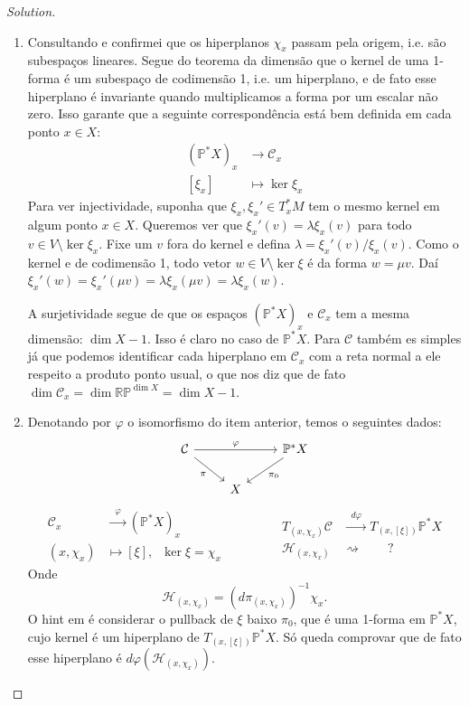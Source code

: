 \begin{proof}[Solution]\leavevmode
\begin{enumerate}[label=(\alph*)]
\item Consultando \cite{das} e \cite{arn} confirmei que os hiperplanos $\chi_x$ passam pela origem, i.e. são subespaços lineares. Segue do teorema da dimensão que o kernel de uma 1-forma é um subespaço de codimensão 1, i.e. um hiperplano, e de fato esse hiperplano é invariante quando multiplicamos a forma por um escalar não zero. Isso garante que a seguinte correspondência está bem definida em cada ponto $x \in X$:
\begin{align*}
	(\mathbb{P}^*X)_x &\longrightarrow \mathcal{C}_x \\
	[\xi_x] &\longmapsto \ker \xi_x
\end{align*}
Para ver injectividade, suponha que $\xi_x,\xi_x' \in T^*_xM$ tem o mesmo kernel em algum ponto $x \in X$. Queremos ver que $\xi_x'(v)=\lambda\xi_x(v)$ para todo $v\in V\setminus\ker \xi_x$. Fixe um $v$ fora do kernel e defina $\lambda=\xi_x'(v)/\xi_x(v)$. Como o kernel e de codimensão 1, todo vetor $w \in V\setminus\ker \xi$ é da forma $w=\mu v$. Daí $\xi_x'(w)=\xi_x'(\mu v)=\lambda\xi_x(\mu v)=\lambda\xi_x(w)$.

A surjetividade segue de que os espaços $(\mathbb{P}^*X)_x$ e $\mathcal{C}_x$ tem a mesma dimensão: $\dim X-1$. Isso é claro no caso de $\mathbb{P}^*X$. Para $\mathcal{C}$ também es simples já que podemos identificar cada hiperplano em $\mathcal{C}_x$ com a reta normal a ele respeito a produto ponto usual, o que nos diz que de fato $\dim \mathcal{C}_x=\dim \mathbb{R}\mathbb{P}^{\dim X}=\dim X-1$.
	\item  Denotando por $\varphi$ o isomorfismo do item anterior, temos o seguintes dados:
	\[\begin{tikzcd}
	\mathcal{C}\arrow[rr,"\varphi"]\arrow[dr,"\pi",swap]&&\mathbb{P}^*X\arrow[dl,"\pi_0"]\\
	&X
	\end{tikzcd}\]
	\[\begin{aligned}
		\mathcal{C}_x &\xrightarrow{\;\;\varphi\;\;}(\mathbb{P}^* X)_x  \\
		(x,\chi_x) &\longmapsto [\xi],\;\;\ker \xi=\chi_x 
	\end{aligned}\qquad \qquad \begin{aligned}
	T_{(x,\chi_x)}\mathcal{C} &\xrightarrow{\;\; d\varphi\;\;}T_{(x,[\xi])}\mathbb{P}^*X  \\
		\mathcal{H}_{(x,\chi_x)} &\rightsquigarrow \qquad  ? 
	\end{aligned}\]
	Onde
	\[\mathcal{H}_{(x,\chi_x)}=(d\pi_{(x,\chi_x)})^{-1}\chi_x.\]
	O hint em \cite{das} é considerar o pullback de $\xi$ baixo $\pi_0$, que é uma 1-forma em $\mathbb{P}^*X$, cujo kernel é um hiperplano de $T_{(x,[\xi])}\mathbb{P}^*X$. Só queda comprovar que de fato esse hiperplano é $d\varphi(\mathcal{H}_{(x,\chi_x)})$.


\end{enumerate}
\end{proof}
